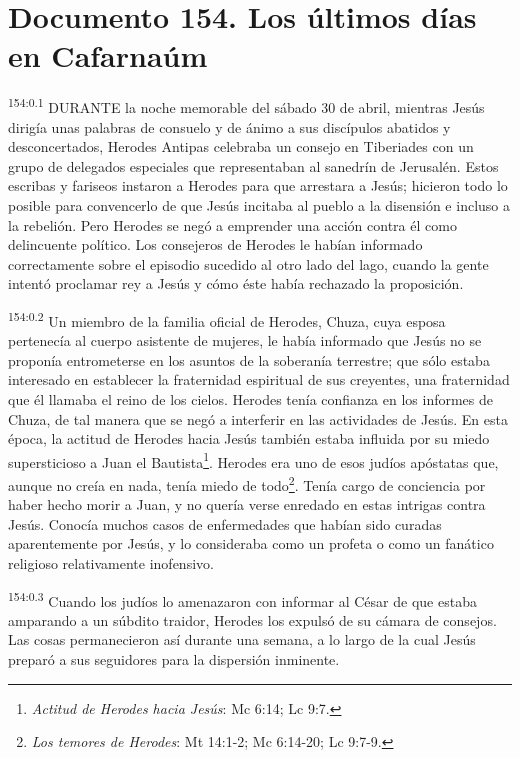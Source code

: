 \chapter{Documento 154. Los últimos días en Cafarnaúm}
\par
\textsuperscript{154:0.1} DURANTE la noche memorable del sábado 30 de abril, mientras Jesús dirigía unas palabras de consuelo y de ánimo a sus discípulos abatidos y desconcertados, Herodes Antipas celebraba un consejo en Tiberiades con un grupo de delegados especiales que representaban al sanedrín de Jerusalén. Estos escribas y fariseos instaron a Herodes para que arrestara a Jesús; hicieron todo lo posible para convencerlo de que Jesús incitaba al pueblo a la disensión e incluso a la rebelión. Pero Herodes se negó a emprender una acción contra él como delincuente político. Los consejeros de Herodes le habían informado correctamente sobre el episodio sucedido al otro lado del lago, cuando la gente intentó proclamar rey a Jesús y cómo éste había rechazado la proposición.

\par
\textsuperscript{154:0.2} Un miembro de la familia oficial de Herodes, Chuza, cuya esposa pertenecía al cuerpo asistente de mujeres, le había informado que Jesús no se proponía entrometerse en los asuntos de la soberanía terrestre; que sólo estaba interesado en establecer la fraternidad espiritual de sus creyentes, una fraternidad que él llamaba el reino de los cielos. Herodes tenía confianza en los informes de Chuza, de tal manera que se negó a interferir en las actividades de Jesús. En esta época, la actitud de Herodes hacia Jesús también estaba influida por su miedo supersticioso a Juan el Bautista\footnote{\textit{Actitud de Herodes hacia Jesús}: Mc 6:14; Lc 9:7.}. Herodes era uno de esos judíos apóstatas que, aunque no creía en nada, tenía miedo de todo\footnote{\textit{Los temores de Herodes}: Mt 14:1-2; Mc 6:14-20; Lc 9:7-9.}. Tenía cargo de conciencia por haber hecho morir a Juan, y no quería verse enredado en estas intrigas contra Jesús. Conocía muchos casos de enfermedades que habían sido curadas aparentemente por Jesús, y lo consideraba como un profeta o como un fanático religioso relativamente inofensivo.

\par
\textsuperscript{154:0.3} Cuando los judíos lo amenazaron con informar al César de que estaba amparando a un súbdito traidor, Herodes los expulsó de su cámara de consejos. Las cosas permanecieron así durante una semana, a lo largo de la cual Jesús preparó a sus seguidores para la dispersión inminente.

